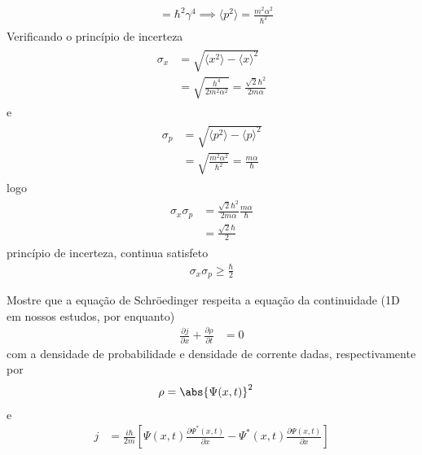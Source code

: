 \begin{prob}
\begin{sol}
\begin{enumerate}[label=\alph *)]
\begin{align}
\begin{split}
																		&= \hbar^{2} \gamma^{4}\implies{\boxed{\langle p^{2} \rangle=\frac{m^{2} \alpha^{2}}{\hbar^{2}}}}
						\end{split}
					\end{align}
					Verificando o princípio de incerteza
					\begin{align}
							\begin{split}
								\sigma_{x} &= \sqrt{\langle x^{2} \rangle-\langle x \rangle^{2}}\\
													 &=\sqrt{\frac{h^{4}}{2m^{2} \alpha^{2}}}=\frac{\sqrt{2}\hbar^{2}}{2m \alpha}
							\end{split}
					\end{align}
					e
					\begin{align}
							\begin{split}
								\sigma_{p} &= \sqrt{\langle p^{2} \rangle-\langle p \rangle^{2}}\\
													 &=\sqrt{\frac{m^{2} \alpha^{2}}{\hbar^{2}}}=\frac{m \alpha}{\hbar}
							\end{split}
					\end{align}
					logo
					\begin{align}
							\begin{split}
								\sigma_{x} \sigma_{p} &= \frac{\sqrt{2}\hbar^{2}}{2m \alpha}\frac{m \alpha}{\hbar}\\
																			&= \frac{\sqrt{2}\hbar}{2}
							\end{split}
					\end{align}
					 princípio de incerteza, continua satisfeto
					 \begin{align}
					 		\boxed{
								\sigma_{x} \sigma_{p} \geq \frac{\hbar}{2}
							}
					 \end{align}
		\end{enumerate}
	\end{sol}
\end{prob}
\begin{prob}
	Mostre que a equação de Schröedinger respeita a equação da continuidade (1D em nossos estudos, por enquanto)	
	\begin{align}
		\frac{\partial j}{\partial x}+\frac{\partial \rho}{\partial t} &= 0
	\end{align}
	com a densidade de probabilidade e  densidade de corrente dadas, respectivamente por
	\begin{align}
		\rho &= \abs{\Psi(x,t)}^{2}
	\end{align}
	e
	\begin{align}
		j &= \frac{i \hbar}{2m}\left[\Psi(x,t)\frac{\partial \Psi^{*}(x,t)}{\partial x}-\Psi^{*}(x,t)\frac{\partial \Psi(x,t)}{\partial x}\right]
	\end{align}
\end{prob}
